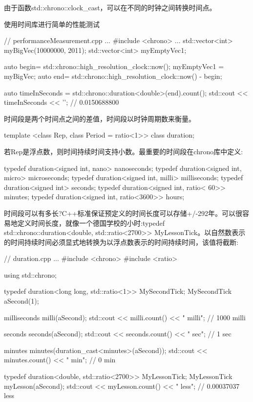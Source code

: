 由于函数std::chrono::clock\_cast，可以在不同的时钟之间转换时间点。

\begin{myTip}{使用时间库进行简单的性能测试}
	

\begin{cpp}
// performanceMeasurement.cpp
...
#include <chrono>
...
std::vector<int> myBigVec(10000000, 2011);
std::vector<int> myEmptyVec1;

auto begin= std::chrono::high_resolution_clock::now();
myEmptyVec1 = myBigVec;
auto end= std::chrono::high_resolution_clock::now() - begin;

auto timeInSeconds = std::chrono::duration<double>(end).count();
std::cout << timeInSeconds << '\n'; // 0.0150688800
\end{cpp}
	
\end{myTip}



时间段是两个时间点之间的差值，时间段以时钟周期数来衡量。

\begin{cpp}
template <class Rep, class Period = ratio<1>> class duration;
\end{cpp}

若Rep是浮点数，则时间持续时间支持小数。最重要的时间段在chrono库中定义:

\begin{cpp}
typedef duration<signed int, nano> nanoseconds;
typedef duration<signed int, micro> microseconds;
typedef duration<signed int, milli> milliseconds;
typedef duration<signed int> seconds;
typedef duration<signed int, ratio< 60>> minutes;
typedef duration<signed int, ratio<3600>> hours;
\end{cpp}

时间段可以有多长?C++标准保证预定义的时间长度可以存储+/-292年。可以很容易地定义时间长度，就像一个德国学校的小时:typedef std::chrono::duration<double, std::ratio<2700>{}> MyLessonTick。以自然数表示的时间持续时间必须显式地转换为以浮点数表示的时间持续时间，该值将截断:


\begin{cpp}
// duration.cpp
...
#include <chrono>
#include <ratio>

using std::chrono;

typedef duration<long long, std::ratio<1>> MySecondTick;
MySecondTick aSecond(1);

milliseconds milli(aSecond);
std::cout << milli.count() << " milli"; // 1000 milli

seconds seconds(aSecond);
std::cout << seconds.count() << " sec"; // 1 sec

minutes minutes(duration_cast<minutes>(aSecond));
std::cout << minutes.count() << " min"; // 0 min

typedef duration<double, std::ratio<2700>> MyLessonTick;
MyLessonTick myLesson(aSecond);
std::cout << myLesson.count() << " less"; // 0.00037037 less
\end{cpp}

